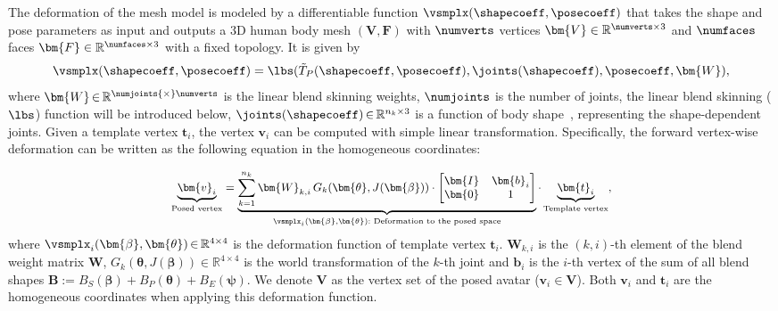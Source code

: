 %
The deformation of the \smpl mesh model is modeled by a differentiable function $\vsmplx(\shapecoeff, \posecoeff)$ that takes the shape and pose parameters as input and outputs a 3D human body mesh $(\bm{V},\bm{F})$ with $\numverts$ vertices $\bm{V}\in\mathbb{R}^{\numverts\times 3}$  and  $\numfaces$ faces $\bm{F}\in\mathbb{R}^{\numfaces\times 3}$ with a fixed topology. 
%
It is given by
\begin{equation}
\vsmplx(\shapecoeff, \posecoeff) =  \lbs(\tilde{T}_P(\shapecoeff, \posecoeff), \joints(\shapecoeff), \posecoeff, \bm{W}),
\end{equation}
where $\bm{W} \, {\in} \, \mathbb{R}^{\numjoints {\times} \numverts}$ is the linear blend skinning weights, $\numjoints$ is the number of joints, the linear blend skinning ($\lbs$) function will be introduced below,  
$\joints(\shapecoeff)\, {\in} \, \mathbb{R}^{n_k {\times} 3}$ is a function of body shape~\cite{SMPL:2015}, representing the shape-dependent joints. Given a template vertex $\bm{t}_i$, the vertex $\bm{v}_i$ can be computed with simple linear transformation. Specifically, the forward vertex-wise deformation can be written as the following equation in the homogeneous coordinates:


\begin{equation}
\small
\begin{aligned}
    \underbrace{\bm{v}_i}_{\textnormal{Posed vertex}} = \underbrace{\sum_{k=1}^{n_k}\bm{W}_{k,i} \, G_k(\bm{\theta},J(\bm{\beta}))\cdot
        \begin{bmatrix}
     \bm{I} &  \bm{b}_i \\
      \bm{0} &  1 
  \end{bmatrix}}_{\vsmplx_i(\bm{\beta},\bm{\theta})\textnormal{:~Deformation to the posed space}}\cdot\underbrace{\bm{t}_i}_{\textnormal{Template vertex}},
\end{aligned}
\end{equation}
%
where $\vsmplx_i(\bm{\beta},\bm{\theta}) \, {\in} \, \mathbb{R}^{4 {\times} 4}$ is the deformation function of template vertex $\bm{t}_i$.   
$\bm{W}_{k,i}$ is the $(k,i)$-th element of the blend weight matrix $\bm{W}$, $G_k(\bm{\theta},J(\bm{\beta}))\in\mathbb{R}^{4\times 4}$ is the world transformation of the $k$-th joint and $\bm{b}_i$ is the $i$-th vertex of the sum of all blend shapes $\bm{B} := B_S(\bm{\beta})+B_P(\bm{\theta})+B_E(\bm{\psi})$. We denote $\bm{V}$ as the vertex set of the posed avatar ($\bm{v}_i\in\bm{V}$). Both $\bm{v}_i$ and $\bm{t}_i$ are the homogeneous coordinates when applying this deformation function. 
